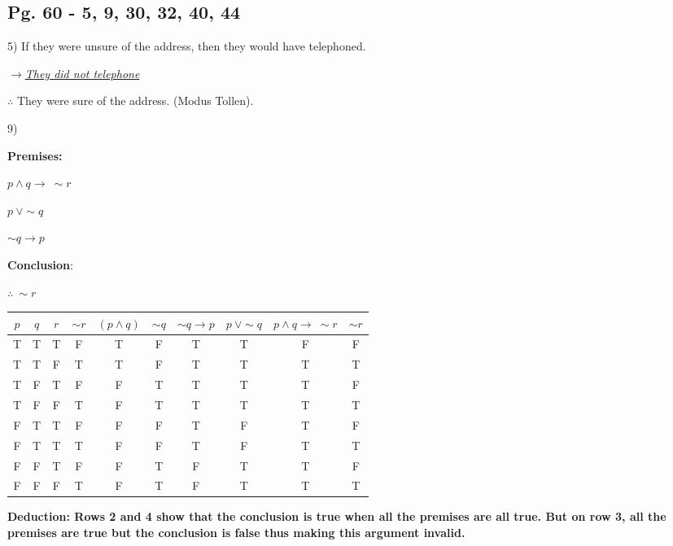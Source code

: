 \documentclass[11pt]{article}
\begin{document}
	
	
	
	
	\subsection{Pg. 60 - 5, 9, 30, 32, 40, 44}
	\begin{flushleft}
	5) If they were unsure of the address, then they would have telephoned.
	
	\textit{\underline{$\to$They did not telephone}}
	
	$\therefore$ They were sure of the address. (Modus Tollen).
	
	\hrulefill
	
	9)\begin{center} \textbf{Premises:} 
			
				 $p \land q \to \ \sim r$
	
				   $p \ \lor \sim q$
				  
				   $\sim q \to p$
				  
	 \textbf{Conclusion}: 
	 
	  $\therefore \  \sim r$
	 
	\end{center}
	\begin{center}
	\begin{tabular}{|c|c|c|c|c|c|c|c|c|c|}\hline
	$p$ & $q$ & $r$ & $\sim r$ & $(p \land  q)$ & $\sim q $& $\sim q \to p $ & $ p \ \lor \sim q$ & $p \land q \to \ \sim r $ & $\sim r$ \\ \hline
	
	T & T & T & F & T & F & T & T & F & F   \\ \hline
	T & T & F & T & T & F & T & T & T & T   \\ \hline
	T & F & T & F & F & T & T & T & T & F   \\ \hline
	T & F & F & T & F & T & T & T & T & T   \\ \hline
	F & T & T & F & F & F & T & F & T & F   \\ \hline
	F & T & T & T & F & F & T & F & T & T   \\ \hline
	F & F & T & F & F & T & F & T & T & F   \\ \hline
	F & F & F & T & F & T & F & T & T & T   \\ \hline
	\end{tabular}
	\end{center}
	\textbf{Deduction: Rows 2 and 4 show that the conclusion is true when all the premises are all true. But on row 3, all the premises are true but the conclusion is false thus making this argument invalid.}
		

\end{flushleft}
\end{document}
